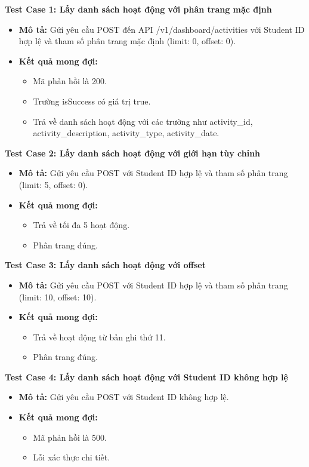 \textbf{Test Case 1: Lấy danh sách hoạt động với phân trang mặc định}
\begin{itemize}
    \item \textbf{Mô tả:} Gửi yêu cầu POST đến API /v1/dashboard/activities với Student ID hợp lệ và tham số phân trang mặc định (limit: 0, offset: 0).
    \item \textbf{Kết quả mong đợi:}
    \begin{itemize}
        \item Mã phản hồi là 200.
        \item Trường isSuccess có giá trị true.
        \item Trả về danh sách hoạt động với các trường như activity\_id, activity\_description, activity\_type, activity\_date.
    \end{itemize}
\end{itemize}

\textbf{Test Case 2: Lấy danh sách hoạt động với giới hạn tùy chỉnh}
\begin{itemize}
    \item \textbf{Mô tả:} Gửi yêu cầu POST với Student ID hợp lệ và tham số phân trang (limit: 5, offset: 0).
    \item \textbf{Kết quả mong đợi:}
    \begin{itemize}
        \item Trả về tối đa 5 hoạt động.
        \item Phân trang đúng.
    \end{itemize}
\end{itemize}

\textbf{Test Case 3: Lấy danh sách hoạt động với offset}
\begin{itemize}
    \item \textbf{Mô tả:} Gửi yêu cầu POST với Student ID hợp lệ và tham số phân trang (limit: 10, offset: 10).
    \item \textbf{Kết quả mong đợi:}
    \begin{itemize}
        \item Trả về hoạt động từ bản ghi thứ 11.
        \item Phân trang đúng.
    \end{itemize}
\end{itemize}

\textbf{Test Case 4: Lấy danh sách hoạt động với Student ID không hợp lệ}
\begin{itemize}
    \item \textbf{Mô tả:} Gửi yêu cầu POST với Student ID không hợp lệ.
    \item \textbf{Kết quả mong đợi:}
    \begin{itemize}
        \item Mã phản hồi là 500.
        \item Lỗi xác thực chi tiết.
    \end{itemize}
\end{itemize}

